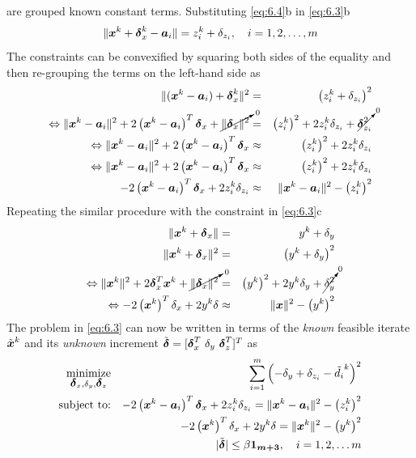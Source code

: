  are grouped known constant terms.
Substituting \ref{eq:6.4}b in \ref{eq:6.3}b
\begin{equation}
\nonumber
\|\mbox{\boldmath$x$}^k + \mbox{\boldmath${\delta}$}^k_x - \mbox{\boldmath$a$}_i\| = z^k_i +\delta_{z_i}, \quad i = 1, 2, \ldots, m
\end{equation}
The constraints can be convexified by squaring both sides of the equality and then re-grouping the terms on the left-hand side as
\begin{eqnarray}
\nonumber
\|(\mbox{\boldmath$x$}^k  - \mbox{\boldmath$a$}_i) + \mbox{\boldmath${\delta}$}^k_x\|^2 & = & \left(z^k_i +\delta_{z_i}\right)^2 \\
\nonumber
\Leftrightarrow 
\|\mbox{\boldmath$x$}^k  - \mbox{\boldmath$a$}_i\|^2 + 2\left( \mbox{\boldmath$x$}^k  - \mbox{\boldmath$a$}_i \right)^T\mbox{\boldmath${\delta}$}_x + \cancelto{\mbox{\scriptsize{0}}}{\|\mbox{\boldmath${\delta}$}_x\|^2}  & = & \left(z_i^k\right)^2 + 2z_i^k\delta_{z_i} + \cancelto{\mbox{\scriptsize{0}}}{\mbox{\boldmath${\delta}$}^2_{z_i}} \\
\nonumber
\Leftrightarrow \|\mbox{\boldmath$x$}^k  - \mbox{\boldmath$a$}_i\|^2 + 2\left( \mbox{\boldmath$x$}^k  - \mbox{\boldmath$a$}_i \right)^T\mbox{\boldmath${\delta}$}_x   & \approx & \left(z_i^k\right)^2 + 2z_i^k\delta_{z_i} \\
\nonumber
\Leftrightarrow \|\mbox{\boldmath$x$}^k  - \mbox{\boldmath$a$}_i\|^2 + 2\left( \mbox{\boldmath$x$}^k  - \mbox{\boldmath$a$}_i \right)^T\mbox{\boldmath${\delta}$}_x   & \approx & \left(z_i^k\right)^2 + 2z_i^k\delta_{z_i} \\
\nonumber
- 2\left( \mbox{\boldmath$x$}^k  - \mbox{\boldmath$a$}_i \right)^T\mbox{\boldmath${\delta}$}_x + 2z_i^k\delta_{z_i}  & \approx & \|\mbox{\boldmath$x$}^k  - \mbox{\boldmath$a$}_i\|^2 - \left(z_i^k\right)^2
\end{eqnarray}
Repeating the similar procedure with the constraint in \ref{eq:6.3}c
\begin{eqnarray}
\nonumber
\|\mbox{\boldmath$x$}^k + \mbox{\boldmath${\delta}$}_x\| & = & y^k + \delta_y \\
\nonumber
\|\mbox{\boldmath$x$}^k + \mbox{\boldmath${\delta}$}_x\|^2 & = & \left(y^k + \delta_y \right)^2 \\
\nonumber
\Leftrightarrow \|\mbox{\boldmath$x$}^k\|^2 + 2\mbox{\boldmath${\delta}$}_x^T\mbox{\boldmath$x$}^k + \cancelto{\mbox{\scriptsize{0}}}{\|\mbox{\boldmath${\delta}$}_x\|^2} & = & \left(y^k\right)^2 + 2y^k\delta_y +  \cancelto{\mbox{\scriptsize{0}}}{\delta_y^2} \\
\nonumber
\Leftrightarrow -2\left(\mbox{\boldmath$x$}^k\right)^T\delta_x + 2y^k\delta & \approx & \|\mbox{\boldmath$x$}\|^2 - \left(y^k\right)^2
\end{eqnarray}
The problem in \ref{eq:6.3} can now be written in terms of the \textit{known} feasible  iterate $\tilde{\mbox{\boldmath$x$}}^k$ and its \textit{unknown} increment  $\tilde{\mbox{\boldmath${\delta}$}} = [\mbox{\boldmath${\delta}$}_x^T \  \delta_y \ \mbox{\boldmath${\delta}$}_{z}^T]^T$ as
\begin{eqnarray} \label{eq:6.6}
\mathop{\mbox{minimize}}_{\mbox{\boldmath${\delta}$}_x, \delta_y, \mbox{\boldmath${\delta}$}_z}& &\sum^m_{i=1}\left( -\delta_y + \delta_{z_i} -\tilde{d_i}^k\right)^2\\
\nonumber
\mbox{subject to:}& &- 2\left( \mbox{\boldmath$x$}^k  - \mbox{\boldmath$a$}_i \right)^T\mbox{\boldmath${\delta}$}_x + 2z_i^k\delta_{z_i}  = \|\mbox{\boldmath$x$}^k  - \mbox{\boldmath$a$}_i\|^2 - \left(z_i^k\right)^2 \\
\nonumber
& &-2\left(\mbox{\boldmath$x$}^k\right)^T\delta_x + 2y^k\delta = \|\mbox{\boldmath$x$}^k\|^2 - \left(y^k\right)^2 \\
\nonumber
& &|{\tilde{\mbox{\boldmath${\delta}$}}}|  \leq \beta\mbox{\boldmath${1_{m+3}}$}, \quad  i = 1, 2, \ldots m
\end{eqnarray}
